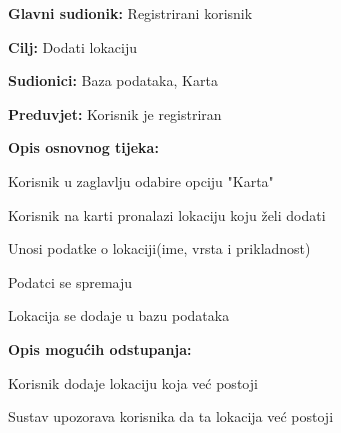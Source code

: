 				\noindent {}
					\begin{packed_item}
	
						\item \textbf{Glavni sudionik: } Registrirani korisnik
						\item  \textbf{Cilj:} Dodati lokaciju
						\item  \textbf{Sudionici:} Baza podataka, Karta
						\item  \textbf{Preduvjet:} Korisnik je registriran
						\item  \textbf{Opis osnovnog tijeka:}
						
						\item[] \begin{packed_enum}
	
							\item Korisnik u zaglavlju odabire opciju "Karta"
							\item Korisnik na karti pronalazi lokaciju koju želi dodati
							\item Unosi podatke o lokaciji(ime, vrsta i prikladnost)
                            \item Podatci se spremaju
							\item Lokacija se dodaje u bazu podataka
							
						\end{packed_enum}
						
						\item  \textbf{Opis mogućih odstupanja:}
						
						\item[] \begin{packed_item}
	
							\item[2.a] Korisnik dodaje lokaciju koja već postoji
							\item[] \begin{packed_enum}
								
								\item Sustav upozorava korisnika da ta lokacija već postoji
								
							\end{packed_enum}
						\end{packed_item}
					\end{packed_item}

